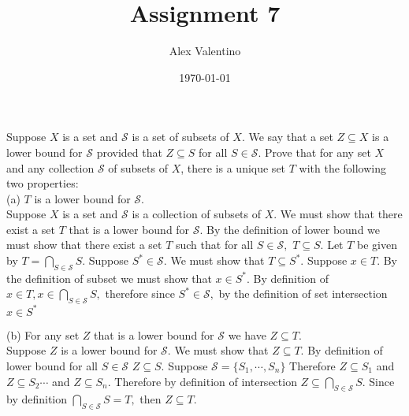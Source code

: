 \documentclass[12pt, letterpaper]{article}
\date{\today}
\author{Alex Valentino}
\title{Assignment 7}
\newcommand{\Sc}{\mathcal{S}}
\begin{document}
	Suppose $X$ is a set and $\mathcal{S}$ is a set of subsets of $X$. We say that a set $Z \subseteq X$ is a lower bound for $\mathcal{S}$ provided that $Z \subseteq S$ for all $S \in \mathcal{S}$. Prove that for any set $X$ and any collection $\mathcal{S}$ of subsets of $X$, there is a unique set $T$ with the following two properties:\\
(a) $T$ is a lower bound for $\mathcal{S}$.\\
Suppose $X$ is a set and $\mathcal{S}$ is a collection of subsets of $X$.  We must show that there exist a set $T$ that is a lower bound for $\mathcal{S}$.  By the definition of lower bound we must show that there exist a set $T$ such that for all $S \in \Sc,$ $T \subseteq S.$  Let $T$ be given by $T = \displaystyle \bigcap_{S \in \Sc}S$.  Suppose $S^* \in \Sc.$  We must show that $T \subseteq S^*.$  Suppose $x \in T.$  By the definition of subset we must show that $x \in S^*.$  By definition of $x \in T, x \in \displaystyle \bigcap_{S \in \Sc} S,$ therefore since $S^* \in \Sc,$ by the definition of set intersection $x \in S^*$

(b) For any set $Z$ that is a lower bound for $\mathcal{S}$ we have $Z \subseteq T$.\\
Suppose $Z$ is a lower bound for $\Sc$.  We must show that $Z \subseteq T.$  By definition of lower bound for all $S \in \Sc$ $Z \subseteq S.$  Suppose $\Sc = \{S_1, \cdots, S_n\}$  Therefore $Z \subseteq S_1$ and $Z \subseteq S_2 \cdots $ and $Z \subseteq S_n.$  Therefore by definition of intersection $Z \subseteq \displaystyle \bigcap_{S \in \Sc} S.$  Since by definition $\bigcap_{S \in \Sc} S = T, $ then $Z \subseteq T.$
\end{document}
